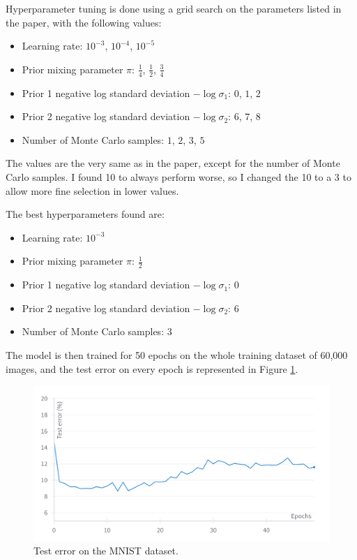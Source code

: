 \documentclass{article}
\begin{document}
Hyperparameter tuning is done using a grid search on the parameters listed in the paper, with the following values:
\begin{itemize}
    \item Learning rate: $10^{-3}$, $10^{-4}$, $10^{-5}$
    \item Prior mixing parameter $\pi$: $\frac{1}{4}$, $\frac{1}{2}$, $\frac{3}{4}$
    \item Prior 1 negative log standard deviation $- \log \sigma_1$: $0$, $1$, $2$
    \item Prior 2 negative log standard deviation $- \log \sigma_2$: $6$, $7$, $8$
    \item Number of Monte Carlo samples: $1$, $2$, $3$, $5$
\end{itemize}
The values are the very same as in the paper, except for the number of Monte Carlo samples. I found 10 to always perform worse, so I changed the 10 to a 3 to allow more fine selection in lower values.

The best hyperparameters found are:
\begin{itemize}
    \item Learning rate: $10^{-3}$
    \item Prior mixing parameter $\pi$: $\frac{1}{2}$
    \item Prior 1 negative log standard deviation $- \log \sigma_1$: $0$
    \item Prior 2 negative log standard deviation $- \log \sigma_2$: $6$
    \item Number of Monte Carlo samples: $3$
\end{itemize}

The model is then trained for 50 epochs on the whole training dataset of 60,000 images, and the test error on every epoch is represented in Figure \ref{fig:mnist-test-error}.

\begin{figure}
    \centering
    \includegraphics[width=\linewidth]{asi_mnist_test_error.png}
    \caption{Test error on the MNIST dataset.}
    \label{fig:mnist-test-error}
\end{figure}
\end{document}
